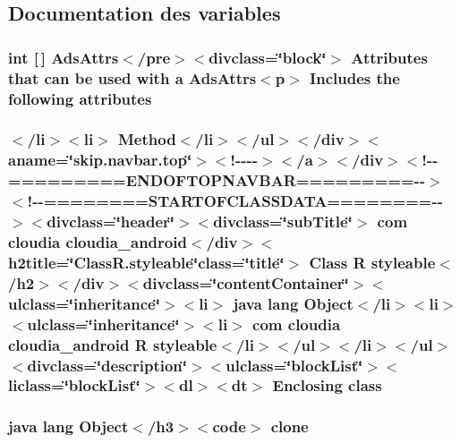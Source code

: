 \subsection{Documentation des variables}
\hypertarget{_r_8styleable_8html_a0b04f952685a46fe63ae21e4bd3c1f05}{
\subsubsection[{attributes}]{\setlength{\rightskip}{0pt plus 5cm}int \mbox{[}$\,$\mbox{]} Ads\-Attrs$<$/pre$>$$<$divclass=\char`\"{}block\char`\"{}$>$ Attributes that can be used with {\bf a} Ads\-Attrs$<$p$>$ Includes the following attributes}}\label{_r_8styleable_8html_a0b04f952685a46fe63ae21e4bd3c1f05}
\hypertarget{_r_8styleable_8html_a245e4c015a18fd4212e4de3bca08ee45}{
\subsubsection[{class}]{\setlength{\rightskip}{0pt plus 5cm}$<$/li$>$$<$li$>$ Method$<$/li$>$$<$/ul$>$$<$/div$>$$<$aname=\char`\"{}skip.\-navbar.\-top\char`\"{}$>$$<$!-\/-\/-\/-\/$>$$<$/a$>$$<$/div$>$$<$!-\/-\/=========E\-N\-D\-O\-F\-T\-O\-P\-N\-A\-V\-B\-A\-R=========-\/-\/$>$$<$!-\/-\/========S\-T\-A\-R\-T\-O\-F\-C\-L\-A\-S\-S\-D\-A\-T\-A========-\/-\/$>$$<$divclass=\char`\"{}header\char`\"{}$>$$<$divclass=\char`\"{}sub\-Title\char`\"{}$>$ com cloudia cloudia\-\_\-android$<$/div$>$$<$h2title=\char`\"{}Class\-R.\-styleable\char`\"{}class=\char`\"{}title\char`\"{}$>$ Class {\bf R} {\bf styleable}$<$/h2$>$$<$/div$>$$<$divclass=\char`\"{}content\-Container\char`\"{}$>$$<$ulclass=\char`\"{}inheritance\char`\"{}$>$$<$li$>$ java lang Object$<$/li$>$$<$li$>$$<$ulclass=\char`\"{}inheritance\char`\"{}$>$$<$li$>$ com cloudia cloudia\-\_\-android {\bf R} {\bf styleable}$<$/li$>$$<$/ul$>$$<$/li$>$$<$/ul$>$$<$divclass=\char`\"{}description\char`\"{}$>$$<$ulclass=\char`\"{}block\-List\char`\"{}$>$$<$liclass=\char`\"{}block\-List\char`\"{}$>$$<$dl$>$$<${\bf dt}$>$ Enclosing class}}\label{_r_8styleable_8html_a245e4c015a18fd4212e4de3bca08ee45}
\hypertarget{_r_8styleable_8html_adc9607fcabf6f2d7f401ad52015ef6e0}{
\subsubsection[{clone}]{\setlength{\rightskip}{0pt plus 5cm}java lang Object$<$/h3$>$$<$code$>$ clone}}\label{_r_8styleable_8html_adc9607fcabf6f2d7f401ad52015ef6e0}
